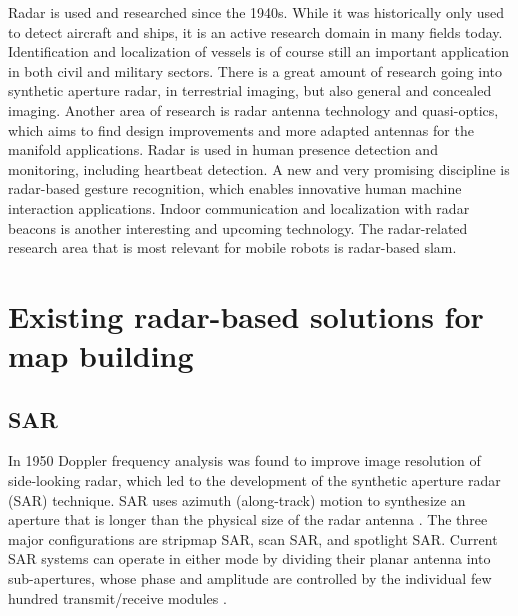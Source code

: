 Radar is used and researched since the 1940s. While it was historically
only used to detect aircraft and ships, it is an active research domain
in many fields today. Identification and localization of vessels is of
course still an important application in both civil and military
sectors. There is a great amount of research going into synthetic
aperture radar, in terrestrial imaging, but also general and concealed
imaging. Another area of research is radar antenna technology and
quasi-optics, which aims to find design improvements and more adapted
antennas for the manifold applications. Radar is used in human presence
detection and monitoring, including heartbeat detection. A new and very
promising discipline is radar-based gesture recognition, which enables
innovative human machine interaction applications. Indoor communication
and localization with radar beacons is another interesting and upcoming
technology. The radar-related research area that is most relevant for
mobile robots is radar-based slam.

\section{Existing radar-based solutions for map
building}\label{existing-radar-based-solutions-for-map-building}

\subsection{SAR}\label{sar}

In 1950 Doppler frequency analysis was found to improve image resolution
of side-looking radar, which led to the development of the synthetic
aperture radar (SAR) technique. SAR uses azimuth (along-track) motion to
synthesize an aperture that is longer than the physical size of the
radar antenna \cite{Wang2008}. The three major configurations are
stripmap SAR, scan SAR, and spotlight SAR. Current SAR systems can
operate in either mode by dividing their planar antenna into
sub-apertures, whose phase and amplitude are controlled by the
individual few hundred transmit/receive modules \cite{Moreira2013}.

